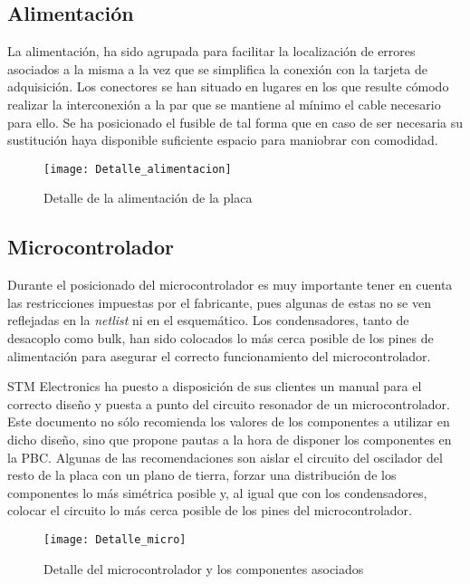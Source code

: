 \clearpage

\subsection{Alimentación\label{sec:PCB_alimentacion}}

La alimentación, ha sido agrupada para facilitar la localización de errores asociados a la misma a la vez que se simplifica la conexión con la tarjeta de adquisición. Los conectores se han situado en lugares en los que resulte cómodo realizar la interconexión a la par que se mantiene al mínimo el cable necesario para ello. Se ha posicionado el fusible de tal forma que en caso de ser necesaria su sustitución haya disponible suficiente espacio para maniobrar con comodidad.

\begin{figure} [h]
    \centering
    \texttt{[image: Detalle\_alimentacion]}
    \caption{Detalle de la alimentación de la placa}
    \label{fig:Detalle_alimentacion}
\end{figure}

\subsection{Microcontrolador\label{sec:PCB_micro}}

Durante el posicionado del microcontrolador es muy importante tener en cuenta las restricciones impuestas por el fabricante, pues algunas de estas no se ven reflejadas en la \textit{netlist} ni en el esquemático. Los condensadores, tanto de desacoplo como bulk, han sido colocados lo más cerca posible de los pines de alimentación para asegurar el correcto funcionamiento del microcontrolador.

STM Electronics ha puesto a disposición de sus clientes un manual para el correcto diseño y puesta a punto del circuito resonador de un microcontrolador. Este documento no sólo recomienda los valores de los componentes a utilizar en dicho diseño, sino que propone pautas a la hora de disponer los componentes en la PBC. Algunas de las recomendaciones son aislar el circuito del oscilador del resto de la placa con un plano de tierra, forzar una distribución de los componentes lo más simétrica posible y, al igual que con los condensadores, colocar el circuito lo más cerca posible de los pines del microcontrolador.

\clearpage

\begin{figure} [h]
    \centering
    \texttt{[image: Detalle\_micro]}
    \caption{Detalle del microcontrolador y los componentes asociados}
    \label{fig:Detalle_micro}
\end{figure}

